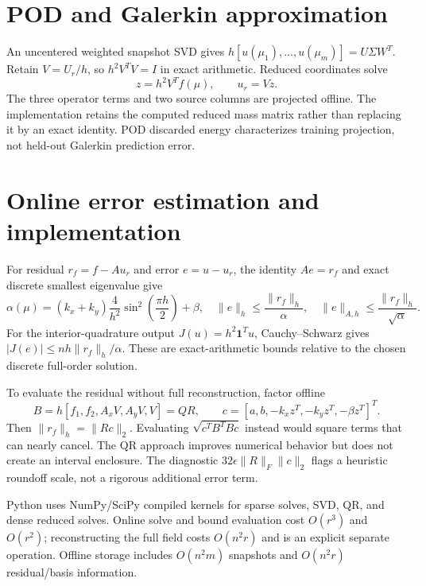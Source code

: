 \documentclass[10pt,a4paper]{article}
\begin{document}
\section{POD and Galerkin approximation}
An uncentered weighted snapshot SVD gives $h[u(\mu_1),\ldots,u(\mu_m)]=U\Sigma W^T$. Retain $V=U_r/h$, so $h^2V^TV=I$ in exact arithmetic. Reduced coordinates solve
\begin{equation}
[h^2V^TA(\mu)V]z=h^2V^Tf(\mu),\qquad u_r=Vz.
\end{equation}
The three operator terms and two source columns are projected offline. The implementation retains the computed reduced mass matrix rather than replacing it by an exact identity. POD discarded energy characterizes training projection, not held-out Galerkin prediction error.
\newpage
\section{Online error estimation and implementation}
For residual $r_f=f-Au_r$ and error $e=u-u_r$, the identity $Ae=r_f$ and exact discrete smallest eigenvalue give
\begin{equation}
\alpha(\mu)=(k_x+k_y)\frac{4}{h^2}\sin^2\left(\frac{\pi h}{2}\right)+\beta,
\quad \|e\|_h\le\frac{\|r_f\|_h}{\alpha},\quad
\|e\|_{A,h}\le\frac{\|r_f\|_h}{\sqrt\alpha}.
\end{equation}
For the interior-quadrature output $J(u)=h^2\mathbf1^Tu$, Cauchy--Schwarz gives $|J(e)|\le nh\|r_f\|_h/\alpha$. These are exact-arithmetic bounds relative to the chosen discrete full-order solution.

To evaluate the residual without full reconstruction, factor offline
\begin{equation}
B=h[f_1,f_2,A_xV,A_yV,V]=QR,\qquad
c=[a,b,-k_xz^T,-k_yz^T,-\beta z^T]^T.
\end{equation}
Then $\|r_f\|_h=\|Rc\|_2$. Evaluating $\sqrt{c^TB^TBc}$ instead would square terms that can nearly cancel. The QR approach improves numerical behavior but does not create an interval enclosure. The diagnostic $32\epsilon\|R\|_F\|c\|_2$ flags a heuristic roundoff scale, not a rigorous additional error term.

Python uses NumPy/SciPy compiled kernels for sparse solves, SVD, QR, and dense reduced solves. Online solve and bound evaluation cost $O(r^3)$ and $O(r^2)$; reconstructing the full field costs $O(n^2r)$ and is an explicit separate operation. Offline storage includes $O(n^2m)$ snapshots and $O(n^2r)$ residual/basis information.
\end{document}
